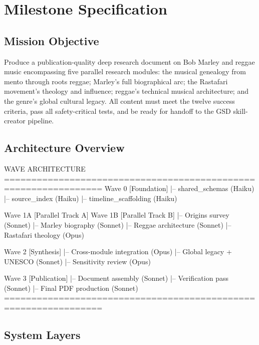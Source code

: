 \documentclass[11pt,letterpaper]{article}
\newcommand{\stageheader}[2]{%
  \noindent\colorbox{#2}{\makebox[\textwidth][l]{%
    \textcolor{white}{\bfseries\sffamily\hspace{6pt}#1\hspace{6pt}}}}%
  \vspace{0.5em}\par%
}
\begin{document}
\newpage

\stageheader{STAGE 3 --- MISSION PACKAGE}{tertiary}

\section{Milestone Specification}

\subsection{Mission Objective}

Produce a publication-quality deep research document on Bob Marley and reggae music encompassing five parallel research modules: the musical genealogy from mento through roots reggae; Marley's full biographical arc; the Rastafari movement's theology and influence; reggae's technical musical architecture; and the genre's global cultural legacy. All content must meet the twelve success criteria, pass all safety-critical tests, and be ready for handoff to the GSD skill-creator pipeline.

\subsection{Architecture Overview}

\begin{asciibox}
WAVE ARCHITECTURE
================================================================
Wave 0  [Foundation]
        |-- shared_schemas (Haiku)
        |-- source_index (Haiku)
        |-- timeline_scaffolding (Haiku)

Wave 1A [Parallel Track A]          Wave 1B [Parallel Track B]
        |-- Origins survey (Sonnet)          |-- Marley biography (Sonnet)
        |-- Reggae architecture (Sonnet)     |-- Rastafari theology (Opus)

Wave 2  [Synthesis]
        |-- Cross-module integration (Opus)
        |-- Global legacy + UNESCO (Sonnet)
        |-- Sensitivity review (Opus)

Wave 3  [Publication]
        |-- Document assembly (Sonnet)
        |-- Verification pass (Sonnet)
        |-- Final PDF production (Sonnet)
================================================================
\end{asciibox}

\subsection{System Layers}
\end{document}
